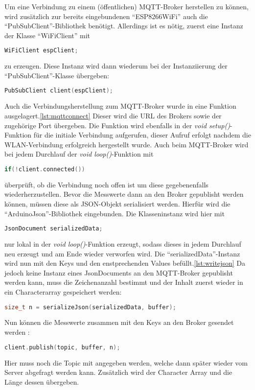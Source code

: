 Um eine Verbindung zu einem (öffentlichen) MQTT-Broker herstellen zu können, wird zusätzlich zur bereits eingebundenen "`ESP8266WiFi"' auch die "`PubSubClient"'-Bibliothek benötigt.
Allerdings ist es nötig, zuerst eine Instanz der Klasse "`WiFiClient"' mit 
\begin{lstlisting}[language=C++]
	WiFiClient espClient;
\end{lstlisting}
zu erzeugen.
Diese Instanz wird dann wiederum bei der Instanziierung der "`PubSubClient"'-Klasse übergeben: 
\begin{lstlisting}[language=C++]
	PubSubClient client(espClient);
\end{lstlisting}
Auch die Verbindungsherstellung zum MQTT-Broker wurde in eine Funktion ausgelagert.\ref{lst:mqttconnect}
Dieser wird die URL des Brokers sowie der zugehörige Port übergeben.
Die Funktion wird ebenfalls in der \textit{void setup()}-Funktion für die initiale Verbindung aufgerufen, dieser Aufruf erfolgt nachdem die WLAN-Verbindung erfolgreich hergestellt wurde.
Auch beim MQTT-Broker wird bei jedem Durchlauf der \textit{void loop()}-Funktion mit 
\begin{lstlisting}[language=C++]
	if(!client.connected())
\end{lstlisting}
überprüft, ob die Verbindung noch offen ist um diese gegebenenfalls wiederherzustellen.
Bevor die Messwerte dann an den Broker gepublisht werden können, müssen diese als JSON-Objekt serialisiert werden.
Hierfür wird die "`ArduinoJson"'-Bibliothek eingebunden.
Die Klasseninstanz wird hier mit 
\begin{lstlisting}[language=C++]
	JsonDocument serializedData;
\end{lstlisting}
nur lokal in der \textit{void loop()}-Funktion erzeugt, sodass dieses in jedem Durchlauf neu erzeugt und am Ende wieder verworfen wird.
Die "`serializedData"'-Instanz wird nun mit den Keys und den enstprechenden Values befüllt.\ref{lst:writejson}
Da jedoch keine Instanz eines JsonDocuments an den MQTT-Broker gepublisht werden kann, muss die Zeichenanzahl bestimmt und der Inhalt zuerst wieder in ein Characterarray gespeichert werden: 
\begin{lstlisting}[language=C++]
	size_t n = serializeJson(serializedData, buffer);
\end{lstlisting}
Nun können die Messwerte zusammen mit den Keys an den Broker gesendet werden : 
\begin{lstlisting}[language=C++]
	client.publish(topic, buffer, n);
\end{lstlisting}
Hier muss noch die Topic mit angegeben werden, welche dann später wieder vom Server abgefragt werden kann.
Zusätzlich wird der Character Array und die Länge dessen übergeben.